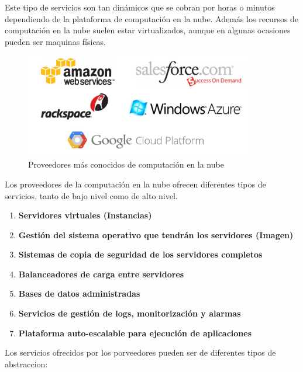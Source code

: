 Este tipo de servicios son tan dinámicos que se cobran por horas o minutos dependiendo de la plataforma de computación en la nube. Además los recursos de computación en la nube suelen estar virtualizados, aunque en algunas ocasiones pueden ser maquinas físicas.
\begin{figure}[!h]
    \centering
    \includegraphics[width=100mm]{img/despliegue/proveedores.png}
    \caption{Proveedores más conocidos de computación en la nube}
\end{figure}

Los proveedores de la computación en la nube ofrecen diferentes tipos de servicios, tanto de bajo nivel como de alto nivel.

\begin{enumerate}
     \item \textbf{Servidores virtuales (Instancias)}
    \item \textbf{Gestión del sistema operativo que tendrán los servidores (Imagen)}
    \item \textbf{Sistemas de copia de seguridad de los servidores completos }
    \item \textbf{Balanceadores de carga entre servidores}
    \item \textbf{Bases de datos administradas }
    \item \textbf{Servicios de gestión de logs, monitorización y alarmas}
    \item \textbf{Plataforma auto-escalable para ejecución de aplicaciones}
\end{enumerate}

Los servicios ofrecidos por los porveedores pueden ser de diferentes tipos de abstraccion:

